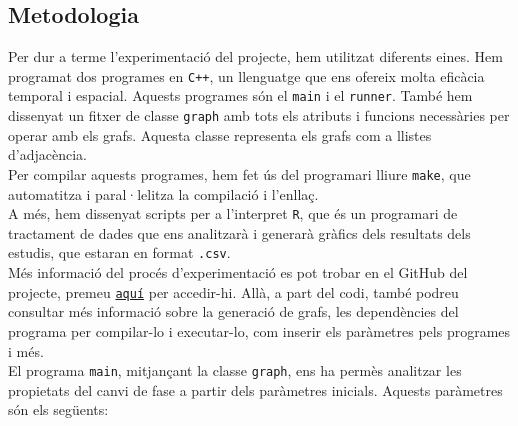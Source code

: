 \documentclass[a4paper]{article}
\begin{document}
	\subsection{Metodologia}
	
	Per dur a terme l'experimentació del projecte, hem utilitzat diferents eines. Hem programat dos programes en \texttt{C++}, un llenguatge que ens ofereix molta eficàcia temporal i espacial. Aquests programes són el \texttt{main} i el \texttt{runner}. També hem dissenyat un fitxer de classe \texttt{graph} amb tots els atributs i funcions necessàries per operar amb els grafs. Aquesta classe representa els grafs com a llistes d'adjacència. \\
	
	Per compilar aquests programes, hem fet ús del programari lliure \texttt{make}, que automatitza i 
	paral·lelitza la compilació i l'enllaç. \\
	
	A més, hem dissenyat scripts per a l'interpret \texttt{R}, que és un programari de tractament de dades que ens analitzarà i generarà gràfics dels resultats dels estudis, que estaran en format \texttt{.csv}. \\
	
	Més informació del procés d'experimentació es pot trobar en el GitHub del projecte, premeu \href{https://github.com/Willyllem88/PercolationConnectivity}{\texttt{aquí}} per accedir-hi. Allà, a part del codi, també podreu consultar més informació sobre la generació de grafs, les dependències del programa per compilar-lo i executar-lo, com inserir els paràmetres pels programes i més. \\
	
	El programa \texttt{main}, mitjançant la classe \texttt{graph}, ens ha permès analitzar les propietats del canvi de fase a partir dels paràmetres inicials. Aquests paràmetres són els següents:
	
\end{document}
